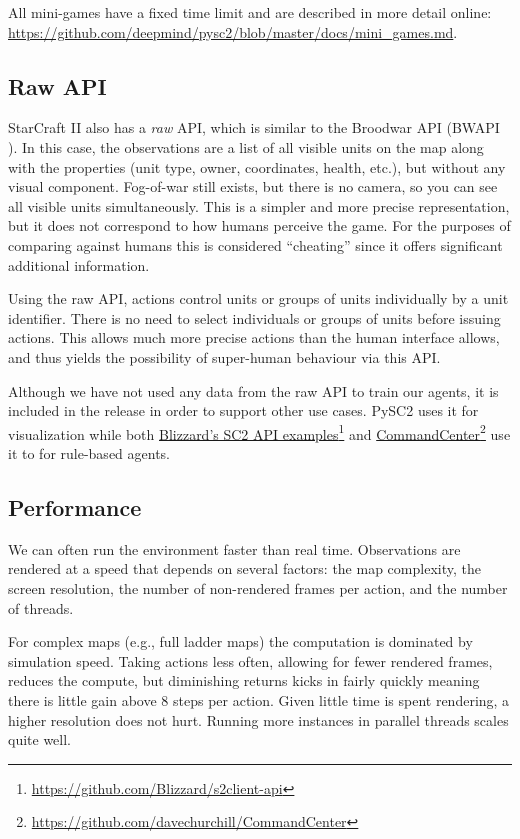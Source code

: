 All mini-games have a fixed time limit and are described in more detail online: \url{
https://github.com/deepmind/pysc2/blob/master/docs/mini_games.md}.

\subsection{Raw API}

StarCraft II also has a \emph{raw} API, which is similar to the Broodwar API (BWAPI \cite{BWAPI}). In this case, the observations are a list of all visible units on the map along with the properties (unit type, owner, coordinates, health, etc.), but without any visual component. Fog-of-war still exists, but there is no camera, so you can see all visible units simultaneously. This is a simpler and more precise representation, but it does not correspond to how humans perceive the game. For the purposes of comparing against humans this is considered ``cheating'' since it offers significant additional information.

Using the raw API, actions control units or groups of units individually by a unit identifier. There is no need to select individuals or groups of units before issuing actions. This allows much more precise actions than the human interface allows, and thus yields the possibility of super-human behaviour via this API.

Although we have not used any data from the raw API to train our agents, it is included in the release in order to support other use cases. PySC2 uses it for visualization while both \href{https://github.com/Blizzard/s2client-api}{Blizzard's SC2 API examples}\footnote{\url{https://github.com/Blizzard/s2client-api}} and \href{https://github.com/davechurchill/CommandCenter}{CommandCenter}\footnote{\url{https://github.com/davechurchill/CommandCenter}} use it to for rule-based agents.

\subsection{Performance}

We can often run the environment faster than real time. Observations are rendered at a speed that depends on several factors: the map complexity, the screen resolution, the number of non-rendered frames per action, and the number of threads.

For complex maps (e.g., full ladder maps) the computation is dominated by simulation speed. Taking actions less often, allowing for fewer rendered frames, reduces the compute, but diminishing returns kicks in fairly quickly meaning there is little gain above 8 steps per action. Given little time is spent rendering, a higher resolution does not hurt. Running more instances in parallel threads scales quite well.

